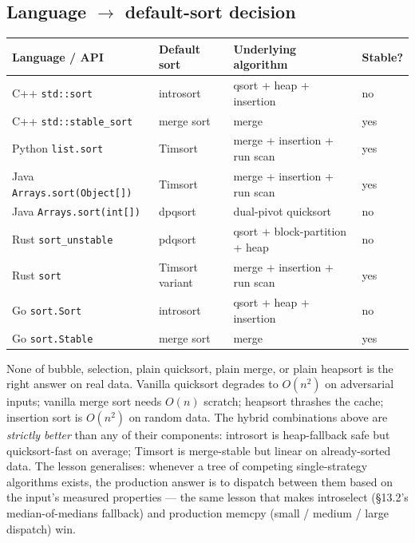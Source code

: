 \documentclass[11pt]{article}
\begin{document}
\subsection*{Language $\to$ default-sort decision}

\begin{center}
\begin{tabular}{llll}
\hline
Language / API & Default sort & Underlying algorithm & Stable? \\
\hline
C++ \texttt{std::sort} & introsort & qsort + heap + insertion & no \\
C++ \texttt{std::stable\_sort} & merge sort & merge & yes \\
Python \texttt{list.sort} & Timsort & merge + insertion + run scan & yes \\
Java \texttt{Arrays.sort(Object[])} & Timsort & merge + insertion + run scan & yes \\
Java \texttt{Arrays.sort(int[])} & dpqsort & dual-pivot quicksort & no \\
Rust \texttt{sort\_unstable} & pdqsort & qsort + block-partition + heap & no \\
Rust \texttt{sort} & Timsort variant & merge + insertion + run scan & yes \\
Go \texttt{sort.Sort} & introsort & qsort + heap + insertion & no \\
Go \texttt{sort.Stable} & merge sort & merge & yes \\
\hline
\end{tabular}
\end{center}

\begin{notebox}
None of bubble, selection, plain quicksort, plain merge, or plain
heapsort is the right answer on real data. Vanilla quicksort
degrades to $O(n^2)$ on adversarial inputs; vanilla merge sort
needs $O(n)$ scratch; heapsort thrashes the cache; insertion sort
is $O(n^2)$ on random data. The hybrid combinations above are
\emph{strictly better} than any of their components: introsort is
heap-fallback safe but quicksort-fast on average; Timsort is
merge-stable but linear on already-sorted data. The lesson
generalises: whenever a tree of competing single-strategy
algorithms exists, the production answer is to dispatch between
them based on the input's measured properties --- the same lesson
that makes introselect (\S13.2's median-of-medians fallback) and
production memcpy (small / medium / large dispatch) win.
\end{notebox}
\end{document}
